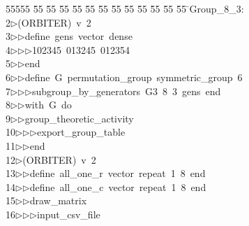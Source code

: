 %
%
\begin{tabbing}
55555 \= 55 \= 55 \= 55 \= 55 \= 55 \= 55 \= 55 \= 55 \= 55 \= 55 \= 55 \= 55 \= \>Group\_8\_3:\\[0pt]
2\>$\triangleright$\>(ORBITER)\ v\ 2\ \\[0pt]
3\>$\triangleright$\>$\triangleright$\>define\ gens\ vector\ dense\ \\[0pt]
4\>$\triangleright$\>$\triangleright$\>$\triangleright$\>102345\ 013245\ 012354\ \\[0pt]
5\>$\triangleright$\>$\triangleright$\>end\ \\[0pt]
6\>$\triangleright$\>$\triangleright$\>define\ G\ permutation\_group\ symmetric\_group\ 6\ \\[0pt]
7\>$\triangleright$\>$\triangleright$\>$\triangleright$\>subgroup\_by\_generators\ G3\ 8\ 3\ gens\ end\ \\[0pt]
8\>$\triangleright$\>$\triangleright$\>with\ G\ do\ \\[0pt]
9\>$\triangleright$\>$\triangleright$\>group\_theoretic\_activity\ \\[0pt]
10\>$\triangleright$\>$\triangleright$\>$\triangleright$\>export\_group\_table\ \\[0pt]
11\>$\triangleright$\>$\triangleright$\>end\\[0pt]
12\>$\triangleright$\>(ORBITER)\ v\ 2\ \\[0pt]
13\>$\triangleright$\>$\triangleright$\>define\ all\_one\_r\ vector\ repeat\ 1\ 8\ end\ \\[0pt]
14\>$\triangleright$\>$\triangleright$\>define\ all\_one\_c\ vector\ repeat\ 1\ 8\ end\ \\[0pt]
15\>$\triangleright$\>$\triangleright$\>draw\_matrix\ \\[0pt]
16\>$\triangleright$\>$\triangleright$\>$\triangleright$\>input\_csv\_file\ \\[0pt]

\end{tabbing}
